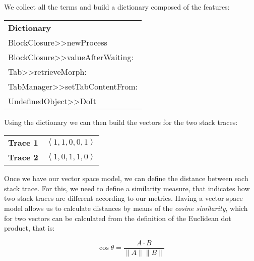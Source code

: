 \pagebreak[2]

We collect all the terms and build a dictionary composed of the features:
{\footnotesize
\begin{center}
\begin{tabular}{l}
\textbf{Dictionary} \\
BlockClosure{>}{>}newProcess \\
BlockClosure{>}{>}valueAfterWaiting: \\
Tab{>}{>}retrieveMorph: \\
TabManager{>}{>}setTabContentFrom: \\
UndefinedObject{>}{>}DoIt
\end{tabular}
\end{center}}


Using the dictionary we can then build the vectors for the two stack traces:

\begin{center}
\begin{tabular}{p{2cm}r}
\textbf{Trace 1} & $\left<1,1,0,0,1\right>$ \\
\textbf{Trace 2} & $\left<1,0,1,1,0\right>$
\end{tabular}
\end{center}

Once we have our vector space model, we can define the distance between each stack trace.
For this, we need to define a similarity measure, that indicates how two stack traces are different according to our metrics.
Having a vector space model allows us to calculate distances by means of the \emph{cosine similarity}, which for two vectors can be calculated from the definition of the Euclidean dot product, that is:

\begin{displaymath}
    \cos\theta=\frac{A \cdot B}{\|A\|\|B\|}
\end{displaymath}


